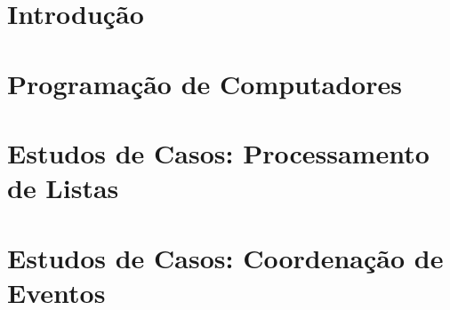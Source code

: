 \documentclass[relatorio]{tex/unemat-comp}
\begin{document}
\chapter*{Introdução}
\label{chap:intro}


\chapter{Programação de Computadores}
\label{chap:prog}


\chapter{Estudos de Casos: Processamento de Listas}
\label{chap:processamentoDeListas}


\chapter{Estudos de Casos: Coordenação de Eventos}
\label{chap:coordenacaoDeEventos}






\cleardoublepage


\arial
\printbibliography[heading=bibintoc,title=\refname]


\end{document}
